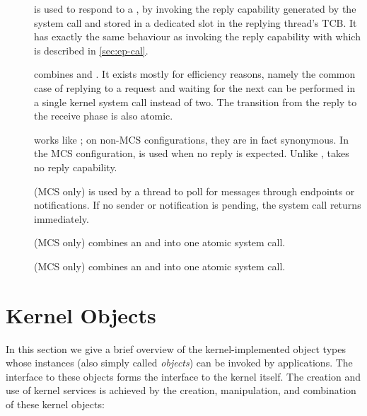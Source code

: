 \begin{description}
    \item[] is used to respond to a
    , by invoking the reply capability generated
    by the  system call and stored in a dedicated
    slot in the replying thread's TCB.  It has exactly the same behaviour as
    invoking the reply capability with  which is
    described in \autoref{sec:ep-cal}.

    \item[] combines
     and .  It
    exists mostly for efficiency reasons, namely the common case of replying to
    a request and waiting for the next can be performed in a single kernel
    system call instead of two.  The transition from the reply to the receive
    phase is also atomic.

    \item[] works like
    ; on non-MCS configurations, they are in fact
    synonymous.  In the MCS configuration,  is
    used when no reply is expected.  Unlike ,
     takes no reply capability.

    \item[] (MCS only) is used by a thread to
    poll for messages through endpoints or notifications.  If no sender or
    notification is pending, the system call returns immediately.

    \item[] (MCS only) combines an
     and  into
    one atomic system call.

    \item[] (MCS only) combines an
     and  into
    one atomic system call.
\end{description}

\section{Kernel Objects}
\label{s:sel4_internals}

In this section we give a brief overview of the kernel-implemented
object types whose instances (also simply called \emph{objects}) can be invoked by applications. The interface to these
objects forms the interface to the kernel itself. The creation and use
of kernel services is achieved by the creation,
manipulation, and combination of these kernel objects:

